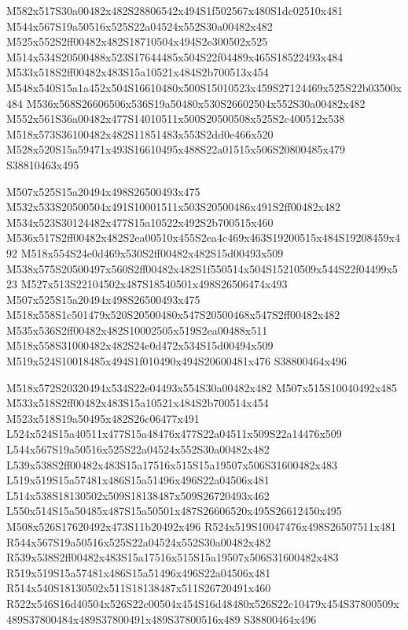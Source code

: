 \documentclass{article}
\begin{document}
\begin{multicols}{2}
M582x517S30a00482x482S28806542x494S1f502567x480S1dc02510x481 M544x567S19a50516x525S22a04524x552S30a00482x482 M525x552S2ff00482x482S18710504x494S2e300502x525 M514x534S20500488x523S17644485x504S22f04489x465S18522493x484 M533x518S2ff00482x483S15a10521x484S2b700513x454 M548x540S15a1a452x504S16610480x500S15010523x459S27124469x525S22b03500x484 M536x568S26606506x536S19a50480x530S26602504x552S30a00482x482 M552x561S36a00482x477S14010511x500S20500508x525S2c400512x538 M518x573S36100482x482S11851483x553S2dd0e466x520 M528x520S15a59471x493S16610495x488S22a01515x506S20800485x479 S38810463x495

M507x525S15a20494x498S26500493x475 M532x533S20500504x491S10001511x503S20500486x491S2ff00482x482 M534x523S30124482x477S15a10522x492S2b700515x460 M536x517S2ff00482x482S2ea00510x455S2ea4c469x463S19200515x484S19208459x492 M518x554S24e0d469x530S2ff00482x482S15d00493x509 M538x575S20500497x560S2ff00482x482S1f550514x504S15210509x544S22f04499x523 M527x513S22104502x487S18540501x498S26506474x493 M507x525S15a20494x498S26500493x475 M518x558S1c501479x520S20500480x547S20500468x547S2ff00482x482 M535x536S2ff00482x482S10002505x519S2ea00488x511 M518x558S31000482x482S24e0d472x534S15d00494x509 M519x524S10018485x494S1f010490x494S20600481x476 S38800464x496

M518x572S20320494x534S22e04493x554S30a00482x482 M507x515S10040492x485 M533x518S2ff00482x483S15a10521x484S2b700514x454 M523x518S19a50495x482S26c06477x491 L524x524S15a40511x477S15a48476x477S22a04511x509S22a14476x509 L544x567S19a50516x525S22a04524x552S30a00482x482 L539x538S2ff00482x483S15a17516x515S15a19507x506S31600482x483 L519x519S15a57481x486S15a51496x496S22a04506x481 L514x538S18130502x509S18138487x509S26720493x462 L550x514S15a50485x487S15a50501x487S26606520x495S26612450x495 M508x526S17620492x473S11b20492x496 R524x519S10047476x498S26507511x481 R544x567S19a50516x525S22a04524x552S30a00482x482 R539x538S2ff00482x483S15a17516x515S15a19507x506S31600482x483 R519x519S15a57481x486S15a51496x496S22a04506x481 R514x540S18130502x511S18138487x511S26720491x460 R522x546S16d40504x526S22c00504x454S16d48480x526S22c10479x454S37800509x489S37800484x489S37800491x489S37800516x489 S38800464x496


\end{multicols}
\end{document}
